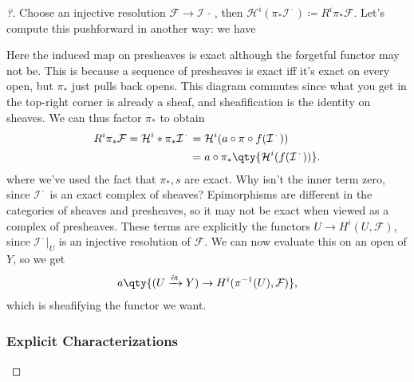 \begin{proof}[?]

Choose an injective resolution
\(\mathcal{F}\to \mathcal{I}{\,\cdot\,}\), then
\(\mathcal{H}^i(\pi_* \mathcal{I}^{\,\cdot\,}) \coloneqq R^i \pi_* \mathcal{F}\).
Let's compute this pushforward in another way: we have

Here the induced map on presheaves is exact although the forgetful
functor may not be. This is because a sequence of presheaves is exact
iff it's exact on every open, but \(\pi_*\) just pulls back opens. This
diagram commutes since what you get in the top-right corner is already a
sheaf, and sheafification is the identity on sheaves. We can thus factor
\(\pi_*\) to obtain
\begin{align*}  
R^i \pi_* \mathcal{F} = \mathcal{H}^i*\pi_* \mathcal{I}^{\,\cdot\,}
&= \mathcal{H}^i(a\circ \pi \circ f (\mathcal{I}^{\,\cdot\,})) \\
&= a\circ \pi_*\qty{\mathcal{H}^i(f(\mathcal{I}^{\,\cdot\,})) }
.\end{align*}
where we've used the fact that \(\pi_*, s\) are exact. Why isn't the
inner term zero, since \(\mathcal{I}^{\,\cdot\,}\) is an exact complex
of sheaves? Epimorphisms are different in the categories of sheaves and
presheaves, so it may not be exact when viewed as a complex of
presheaves. These terms are explicitly the functors
\(U\to H^i(U, \mathcal{F})\), since
\({ \left.{{\mathcal{I}^{\,\cdot\,}}} \right|_{{U}} }\) is an injective
resolution of \(\mathcal{F}\). We can now evaluate this on an open of
\(Y\), so we get
\begin{align*}  
a \qty{ (U \xrightarrow{\text{ét}} Y) \to H^i(\pi^{-1}(U), \mathcal{F}) }
,\end{align*}
which is sheafifying the functor we want.

\hypertarget{explicit-characterizations-1}{%
\subsubsection{Explicit
Characterizations}\label{explicit-characterizations-1}}

\end{proof}

